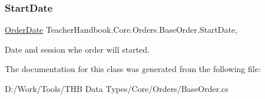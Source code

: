 \subsubsection{\texorpdfstring{Start\+Date}{StartDate}}
{\footnotesize\ttfamily \mbox{\hyperlink{struct_teacher_handbook_1_1_core_1_1_orders_1_1_order_date}{Order\+Date}} Teacher\+Handbook.\+Core.\+Orders.\+Base\+Order.\+Start\+Date\hspace{0.3cm}{\ttfamily [get]}, {\ttfamily [set]}}



Date and session whe order will started. 



The documentation for this class was generated from the following file\+:\begin{DoxyCompactItemize}
\item 
D\+:/\+Work/\+Tools/\+T\+H\+B Data Types/\+Core/\+Orders/Base\+Order.\+cs\end{DoxyCompactItemize}
